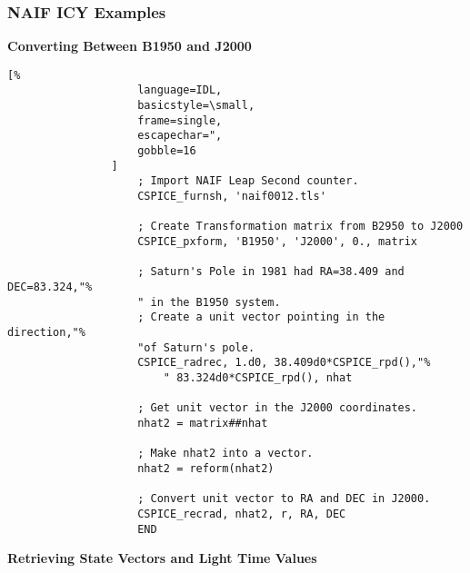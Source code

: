 \documentclass[crop=false,class=book,oneside]{standalone}
\begin{document}
        \subsubsection{NAIF ICY Examples}
                \textbf{Converting Between B1950 and J2000}
                \begin{lstlisting}[%
                    language=IDL,
                    basicstyle=\small,
                    frame=single,
                    escapechar=",
                    gobble=16
                ]
                    ; Import NAIF Leap Second counter.
                    CSPICE_furnsh, 'naif0012.tls'
    
                    ; Create Transformation matrix from B2950 to J2000
                    CSPICE_pxform, 'B1950', 'J2000', 0., matrix
    
                    ; Saturn's Pole in 1981 had RA=38.409 and DEC=83.324,"%
                    " in the B1950 system.
                    ; Create a unit vector pointing in the direction,"%
                    "of Saturn's pole.
                    CSPICE_radrec, 1.d0, 38.409d0*CSPICE_rpd(),"%
                        " 83.324d0*CSPICE_rpd(), nhat
    
                    ; Get unit vector in the J2000 coordinates.
                    nhat2 = matrix##nhat
    
                    ; Make nhat2 into a vector.
                    nhat2 = reform(nhat2)
    
                    ; Convert unit vector to RA and DEC in J2000.
                    CSPICE_recrad, nhat2, r, RA, DEC
                    END
                \end{lstlisting}
                \textbf{Retrieving State Vectors and Light Time Values}
\end{document}
